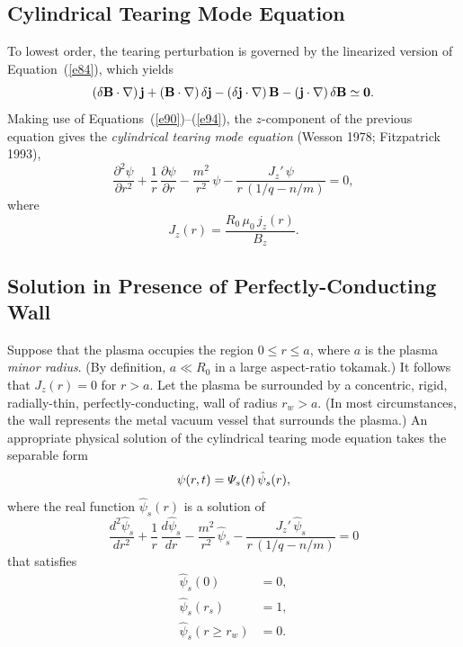 \documentclass[notitlepage,12pt]{article}
\begin{document}
\subsection{Cylindrical Tearing Mode Equation}
To lowest order, the tearing perturbation is governed by the linearized version of Equation~(\ref{e84}), which yields
\begin{equation}\label{e96}
(\delta{\bf B}\cdot \nabla)\,{\bf j} + ({\bf B}\cdot\nabla)\,\delta{\bf j} - (\delta{\bf j}\cdot\nabla)\,{\bf B} - 
({\bf j}\cdot\nabla)\,\delta {\bf B}\simeq {\bf 0}.
\end{equation}
Making use of Equations~(\ref{e90})--(\ref{e94}), the $z$-component of the previous equation gives
the {\em cylindrical tearing mode equation}\/ (Wesson 1978; Fitzpatrick 1993),
\begin{equation}
\frac{\partial^2\psi}{\partial r^2} + \frac{1}{r}\,\frac{\partial\psi}{\partial r}-\frac{m^2}{r^2}\,\psi - \frac{J_z'\,\psi}{r\,(1/q-n/m)}=  0,
\end{equation}
where 
\begin{equation}
J_z(r)= \frac{R_0\,\mu_0\,j_z(r)}{B_z}.
\end{equation}

\subsection{Solution in Presence of Perfectly-Conducting Wall}\label{perfect}
Suppose that the plasma occupies the region $0\leq r\leq a$, where $a$ is the plasma {\em minor radius}. (By definition, $a\ll R_0$ in a large aspect-ratio tokamak.) It follows that
$J_z(r)=0$ for $r>a$. Let the plasma be surrounded by a concentric, rigid, radially-thin, perfectly-conducting, wall of radius $r_w>a$. 
(In most circumstances, the wall represents the metal vacuum vessel that surrounds  the plasma.) An appropriate
physical solution of the cylindrical tearing mode equation takes the separable form
\begin{equation}\label{e99}
\psi(r,t)= {\mit\Psi}_s(t)\,\hat{\psi}_s(r),
\end{equation}
where the real function $\hat{\psi}_s(r)$ is a solution of 
\begin{equation}\label{e100}
\frac{d^2\hat{\psi}_s}{dr^2} + \frac{1}{r}\,\frac{d\hat{\psi}_s}{dr}-\frac{m^2}{r^2}\,\hat{\psi}_s - \frac{J_z'\,\hat{\psi}_s}{r\,(1/q-n/m)}= 0
\end{equation}
that satisfies
\begin{align}\label{e101}
\hat{\psi}_s(0) &= 0,\\[0.5ex]
\hat{\psi}_s(r_s) &= 1,\label{e102}\\[0.5ex]
\hat{\psi}_s(r\geq r_w) &= 0.\label{e103}
\end{align}
\end{document}
